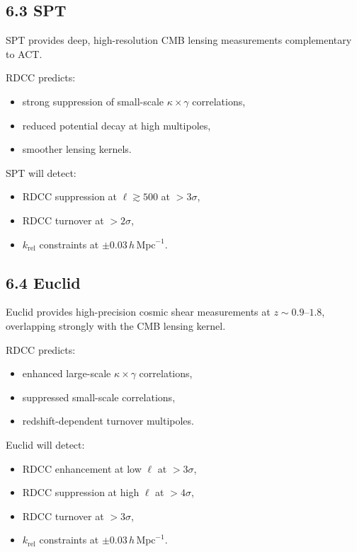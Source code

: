 \documentclass[11pt,a4paper]{article}
\begin{document}
\subsection*{6.3 SPT}

SPT provides deep, high-resolution CMB lensing measurements complementary to ACT.

RDCC predicts:

\begin{itemize}
    \item strong suppression of small-scale $\kappa \times \gamma$ correlations,
    \item reduced potential decay at high multipoles,
    \item smoother lensing kernels.
\end{itemize}

SPT will detect:

\begin{itemize}
    \item RDCC suppression at $\ell \gtrsim 500$ at $>3\sigma$,
    \item RDCC turnover at $>2\sigma$,
    \item $k_{\mathrm{rel}}$ constraints at $\pm 0.03\,h\,\mathrm{Mpc}^{-1}$.
\end{itemize}

\subsection*{6.4 Euclid}

Euclid provides high-precision cosmic shear measurements at $z \sim 0.9$--$1.8$, overlapping 
strongly with the CMB lensing kernel.

RDCC predicts:

\begin{itemize}
    \item enhanced large-scale $\kappa \times \gamma$ correlations,
    \item suppressed small-scale correlations,
    \item redshift-dependent turnover multipoles.
\end{itemize}

Euclid will detect:

\begin{itemize}
    \item RDCC enhancement at low $\ell$ at $>3\sigma$,
    \item RDCC suppression at high $\ell$ at $>4\sigma$,
    \item RDCC turnover at $>3\sigma$,
    \item $k_{\mathrm{rel}}$ constraints at $\pm 0.03\,h\,\mathrm{Mpc}^{-1}$.
\end{itemize}
\end{document}
